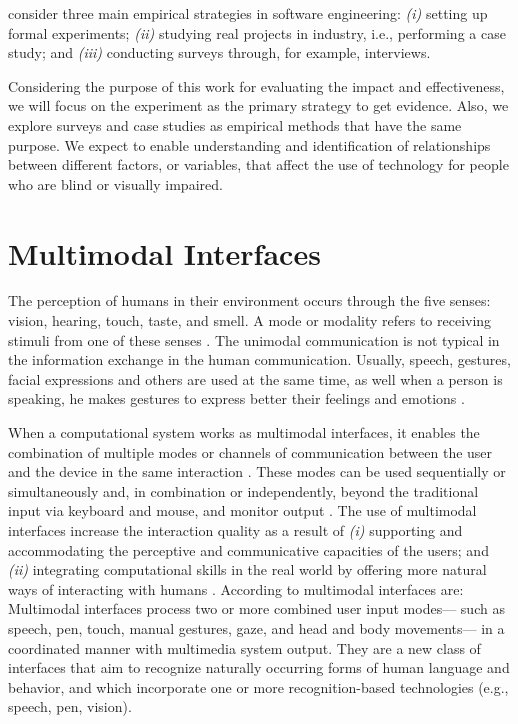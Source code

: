  consider three main empirical strategies in software engineering: \textit{(i)} setting up formal experiments; \textit{(ii)} studying real projects in industry, i.e., performing a case study; and \textit{(iii)} conducting surveys through, for example, interviews.

Considering the purpose of this work for evaluating the impact and effectiveness, we will focus on the experiment as the primary strategy to get evidence. Also, we explore surveys and case studies as empirical methods that have the same purpose. We expect to enable understanding and identification of relationships between different factors, or variables, that affect the use of technology for people who are blind or visually impaired. 

\section{Multimodal Interfaces}
\label{sec:background-multimodal-interfaces}
The perception of humans in their environment occurs through the five senses: vision, hearing, touch, taste, and smell. A mode or modality refers to receiving stimuli from one of these senses \cite{Turk2013}. The unimodal communication is not typical in the information exchange in the human communication. Usually, speech, gestures, facial expressions and others are used at the same time, as well when a person is speaking, he makes gestures to express better their feelings and emotions \cite{Turk2013}.

When a computational system works as multimodal interfaces, it enables the combination of multiple modes or channels of communication between the user and the device in the same interaction \cite{Oviatt2003}. These modes can be used sequentially or simultaneously and, in combination or independently, beyond the traditional input via keyboard and mouse, and monitor output \cite{Neto2008}. The use of multimodal interfaces increase the interaction quality as a result of \textit{(i)} supporting and accommodating the perceptive and communicative capacities of the users; and \textit{(ii)} integrating computational skills in the real world by offering more natural ways of interacting with humans \cite{Dumas2009}. According to  multimodal interfaces are:
Multimodal interfaces process two or more combined user input modes— such as speech, pen, touch, manual gestures, gaze, and head and body movements— in a coordinated manner with multimedia system output. They are a new class of interfaces that aim to recognize naturally occurring forms of human language and behavior, and which incorporate one or more recognition-based technologies (e.g., speech, pen, vision).

